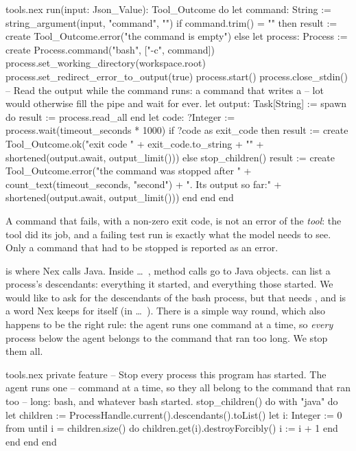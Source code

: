 \begin{continued}{tools.nex}
  run(input: Json_Value): Tool_Outcome do
    let command: String := string_argument(input, "command", "")
    if command.trim() = "" then
      result := create Tool_Outcome.error("the command is empty")
    else
      let process: Process := create Process.command("bash", ["-c", command])
      process.set_working_directory(workspace.root)
      process.set_redirect_error_to_output(true)
      process.start()
      process.close_stdin()
      -- Read the output while the command runs: a command that writes a
      -- lot would otherwise fill the pipe and wait for ever.
      let output: Task[String] := spawn do
        result := process.read_all
      end
      let code: ?Integer := process.wait(timeout_seconds * 1000)
      if ?code as exit_code then
        result := create Tool_Outcome.ok("exit code " + exit_code.to_string + "\n"
          + shortened(output.await, output_limit()))
      else
        stop_children()
        result := create Tool_Outcome.error("the command was stopped after "
          + count_text(timeout_seconds, "second") + ". Its output so far:\n"
          + shortened(output.await, output_limit()))
      end
    end
  end
\end{continued}

A command that fails, with a non-zero exit code, is not an error of the
\emph{tool}: the tool did its job, and a failing test run is exactly what
the model needs to see. Only a command that had to be stopped is reported
as an error.

 is where Nex calls Java. Inside 
\ldots\ , method calls go to Java objects. 
can list a process's descendants: everything it started, and everything
those started. We would like to ask for the descendants of the bash
process, but that needs , and  is a word
Nex keeps for itself (in  \ldots\ ). There is a simple
way round, which also happens to be the right rule: the agent runs one
command at a time, so \emph{every} process below the agent belongs to the
command that ran too long. We stop them all.

\begin{continued}{tools.nex}
  private feature
    -- Stop every process this program has started. The agent runs one
    -- command at a time, so they all belong to the command that ran too
    -- long: bash, and whatever bash started.
    stop_children() do
      with "java" do
        let children := ProcessHandle.current().descendants().toList()
        let i: Integer := 0
        from until i = children.size() do
          children.get(i).destroyForcibly()
          i := i + 1
        end
      end
    end
end
\end{continued}

